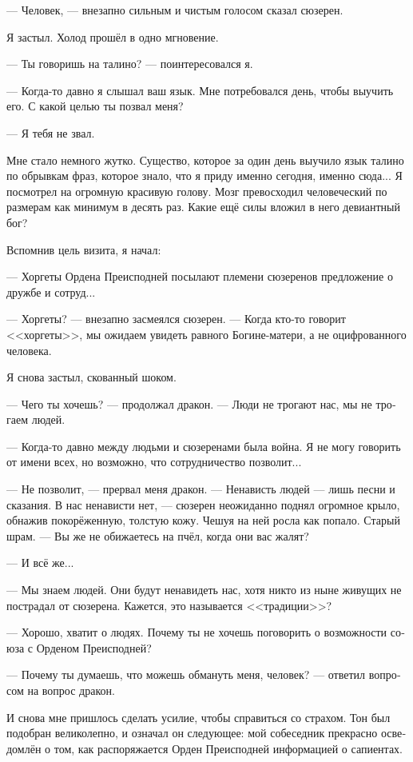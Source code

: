 \documentclass[a4paper,12pt,fleqn]{book}\usepackage{polyglossia}\setdefaultlanguage[babelshorthands=true]{russian}\setotherlanguage{english}\defaultfontfeatures{Ligatures=TeX,Mapping=tex-text}\usepackage{xcolor}\newcommand{\ml}[3]{#2}
\begin{document}
--- Человек, --- внезапно сильным и чистым голосом сказал сюзерен.

Я застыл.
Холод прошёл в одно мгновение.

--- Ты говоришь на талино? --- поинтересовался я.

--- Когда-то давно я слышал ваш язык.
Мне потребовался день, чтобы выучить его.
С какой целью ты позвал меня?

--- Я тебя не звал.

Мне стало немного жутко.
Существо, которое за один день выучило язык талино по обрывкам фраз, которое знало, что я приду именно сегодня, именно сюда...
Я посмотрел на огромную красивую голову.
Мозг превосходил человеческий по размерам как минимум в десять раз.
Какие ещё силы вложил в него девиантный бог?

Вспомнив цель визита, я начал:

--- Хоргеты Ордена Преисподней посылают племени сюзеренов предложение о дружбе и сотруд...

--- Хоргеты? --- внезапно засмеялся сюзерен.
--- Когда кто-то говорит <<хоргеты>>, мы ожидаем увидеть равного Богине-матери, а не оцифрованного человека.

Я снова застыл, скованный шоком.

--- Чего ты хочешь? --- продолжал дракон.
--- Люди не трогают нас, мы не трогаем людей.

--- Когда-то давно между людьми и сюзеренами была война.
Я не могу говорить от имени всех, но возможно, что сотрудничество позволит...

--- Не позволит, --- прервал меня дракон.
--- Ненависть людей --- лишь песни и сказания.
В нас ненависти нет, --- сюзерен неожиданно поднял огромное крыло, обнажив покорёженную, толстую кожу.
Чешуя на ней росла как попало.
Старый шрам.
--- Вы же не обижаетесь на пчёл, когда они вас жалят?

--- И всё же...

--- Мы знаем людей.
Они будут ненавидеть нас, хотя никто из ныне живущих не пострадал от сюзерена.
Кажется, это называется <<традиции>>?

--- Хорошо, хватит о людях.
Почему ты не хочешь поговорить о возможности союза с Орденом Преисподней?

--- Почему ты думаешь, что можешь обмануть меня, человек? --- ответил вопросом на вопрос дракон.

И снова мне пришлось сделать усилие, чтобы справиться со страхом.
Тон был подобран великолепно, и означал он следующее: мой собеседник прекрасно осведомлён о том, как распоряжается Орден Преисподней информацией о сапиентах.
\end{document}

